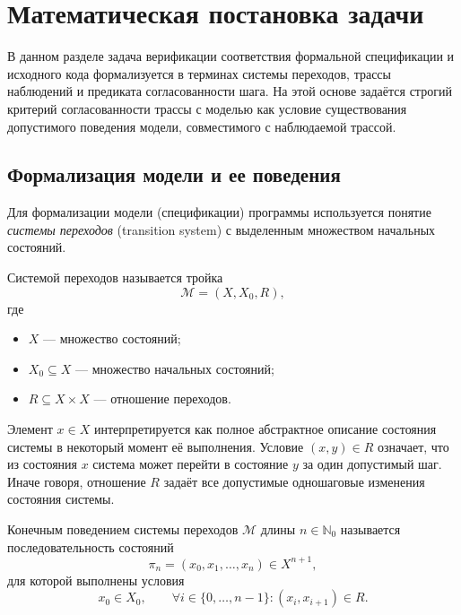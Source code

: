 \section{Математическая постановка задачи}

В данном разделе задача верификации соответствия формальной спецификации и
исходного кода формализуется в терминах системы переходов, трассы наблюдений и
предиката согласованности шага. На этой основе задаётся строгий критерий
согласованности трассы с моделью как условие существования допустимого
поведения модели, совместимого с наблюдаемой трассой.

\subsection{Формализация модели и ее поведения}

Для формализации модели (спецификации) программы используется понятие
\emph{системы переходов} (transition system) \cite{Keller1976} с выделенным
множеством начальных состояний.

\begin{definition}
Системой переходов называется тройка
\begin{equation}\label{f1}
\mathcal{M} = (X, X_0, R),
\end{equation}
где
\begin{itemize}[leftmargin=0pt,itemindent=4.6em]
    \item $X$ --- множество состояний;
    \item $X_0 \subseteq X$ --- множество начальных состояний;
    \item $R \subseteq X \times X$ --- отношение переходов.
\end{itemize}
\end{definition}

Элемент $x \in X$ интерпретируется как полное абстрактное описание состояния
системы в некоторый момент её выполнения. Условие $(x,y) \in R$ означает, что
из состояния $x$ система может перейти в состояние $y$ за один допустимый шаг.
Иначе говоря, отношение $R$ задаёт все допустимые одношаговые изменения
состояния системы.

\begin{definition}
Конечным поведением системы переходов $\mathcal{M}$ длины $n \in \mathbb{N}_0$
называется последовательность состояний
\begin{equation}\label{f2}
\pi_n = (x_0, x_1, \dots, x_n) \in X^{n+1},
\end{equation}
для которой выполнены условия
\[
x_0 \in X_0,
\qquad
\forall i \in \{0,\dots,n-1\} : (x_i,x_{i+1}) \in R.
\]
\end{definition}

